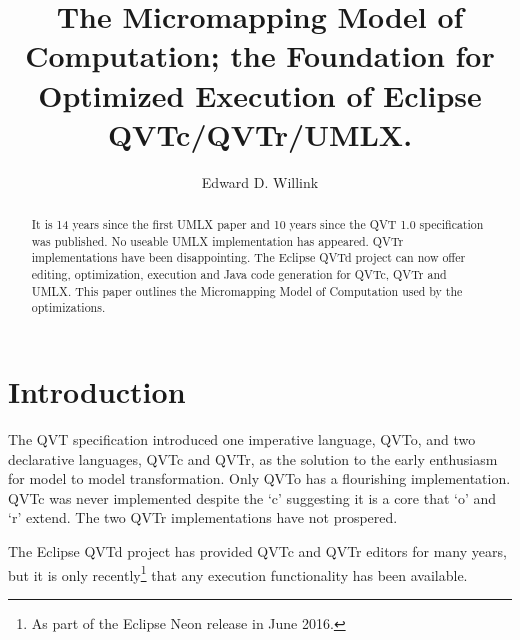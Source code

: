 \documentclass{llncs}
\begin{document}
%
\frontmatter          %
%
%
%
\title{The Micromapping Model of Computation; the Foundation for Optimized Execution of Eclipse QVTc/QVTr/UMLX.}
%
%
\author{Edward D. Willink}
%
%
%

\maketitle              %

\begin{abstract}
It is 14 years since the first UMLX paper and 10 years since the QVT 1.0 specification was published. No useable UMLX implementation has appeared. QVTr implementations have been disappointing. The Eclipse QVTd project can now offer editing, optimization, execution and Java code generation for QVTc, QVTr and UMLX. This paper outlines the Micromapping Model of Computation used by the optimizations.
\end{abstract}
%

\section{Introduction}

The QVT specification introduced one imperative language, QVTo, and two declarative languages, QVTc and QVTr, as the solution to the early enthusiasm for model to model transformation. Only QVTo has a flourishing implementation. QVTc was never implemented despite the `c' suggesting it is a core that `o' and `r' extend. The two QVTr implementations have not prospered.

The Eclipse QVTd project \cite{Eclipse-QVTd} has provided QVTc and QVTr editors for many years, but it is only recently\footnote{As part of the Eclipse Neon release in June 2016.} that any execution functionality has been available.
\end{document}
